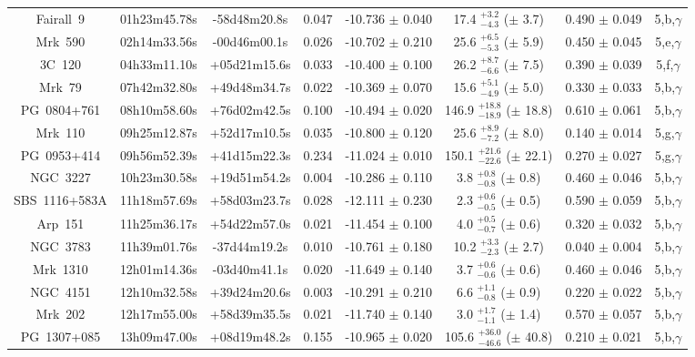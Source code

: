 \documentclass[a4paper,fleqn,usenatbib]{mnras}
\begin{document}
\begin{appendix}
\begin{longtable}{cccccccc}
Fairall~9 & 01h23m45.78s & -58d48m20.8s & 0.047 & -10.736 $\pm$ 0.040 & 17.4 $_{-4.3}^{+3.2}$ ($\pm$ 3.7) & 0.490 $\pm$ 0.049 & 5,b,$\gamma$ \\
Mrk~590 & 02h14m33.56s & -00d46m00.1s & 0.026 & -10.702 $\pm$ 0.210 & 25.6 $_{-5.3}^{+6.5}$ ($\pm$ 5.9) & 0.450 $\pm$ 0.045 & 5,e,$\gamma$ \\
3C~120 & 04h33m11.10s & +05d21m15.6s & 0.033 & -10.400 $\pm$ 0.100 & 26.2 $_{-6.6}^{+8.7}$ ($\pm$ 7.5) & 0.390 $\pm$ 0.039 & 5,f,$\gamma$ \\
Mrk~79 & 07h42m32.80s & +49d48m34.7s & 0.022 & -10.369 $\pm$ 0.070 & 15.6 $_{-4.9}^{+5.1}$ ($\pm$ 5.0) & 0.330 $\pm$ 0.033 & 5,b,$\gamma$ \\
PG~0804+761 & 08h10m58.60s & +76d02m42.5s & 0.100 & -10.494 $\pm$ 0.020 & 146.9 $_{-18.9}^{+18.8}$ ($\pm$ 18.8) & 0.610 $\pm$ 0.061 & 5,b,$\gamma$ \\
Mrk~110 & 09h25m12.87s & +52d17m10.5s & 0.035 & -10.800 $\pm$ 0.120 & 25.6 $_{-7.2}^{+8.9}$ ($\pm$ 8.0) & 0.140 $\pm$ 0.014 & 5,g,$\gamma$ \\
PG~0953+414 & 09h56m52.39s & +41d15m22.3s & 0.234 & -11.024 $\pm$ 0.010 & 150.1 $_{-22.6}^{+21.6}$ ($\pm$ 22.1) & 0.270 $\pm$ 0.027 & 5,g,$\gamma$ \\
NGC~3227 & 10h23m30.58s & +19d51m54.2s & 0.004 & -10.286 $\pm$ 0.110 & 3.8 $_{-0.8}^{+0.8}$ ($\pm$ 0.8) & 0.460 $\pm$ 0.046 & 5,b,$\gamma$ \\
SBS~1116+583A & 11h18m57.69s & +58d03m23.7s & 0.028 & -12.111 $\pm$ 0.230 & 2.3 $_{-0.5}^{+0.6}$ ($\pm$ 0.5) & 0.590 $\pm$ 0.059 & 5,b,$\gamma$ \\
Arp~151 & 11h25m36.17s & +54d22m57.0s & 0.021 & -11.454 $\pm$ 0.100 & 4.0 $_{-0.7}^{+0.5}$ ($\pm$ 0.6) & 0.320 $\pm$ 0.032 & 5,b,$\gamma$ \\
NGC~3783 & 11h39m01.76s & -37d44m19.2s & 0.010 & -10.761 $\pm$ 0.180 & 10.2 $_{-2.3}^{+3.3}$ ($\pm$ 2.7) & 0.040 $\pm$ 0.004 & 5,b,$\gamma$ \\
Mrk~1310 & 12h01m14.36s & -03d40m41.1s & 0.020 & -11.649 $\pm$ 0.140 & 3.7 $_{-0.6}^{+0.6}$ ($\pm$ 0.6) & 0.460 $\pm$ 0.046 & 5,b,$\gamma$ \\
NGC~4151 & 12h10m32.58s & +39d24m20.6s & 0.003 & -10.291 $\pm$ 0.210 & 6.6 $_{-0.8}^{+1.1}$ ($\pm$ 0.9) & 0.220 $\pm$ 0.022 & 5,b,$\gamma$ \\
Mrk~202 & 12h17m55.00s & +58d39m35.5s & 0.021 & -11.740 $\pm$ 0.140 & 3.0 $_{-1.1}^{+1.7}$ ($\pm$ 1.4) & 0.570 $\pm$ 0.057 & 5,b,$\gamma$ \\
PG~1307+085 & 13h09m47.00s & +08d19m48.2s & 0.155 & -10.965 $\pm$ 0.020 & 105.6 $_{-46.6}^{+36.0}$ ($\pm$ 40.8) & 0.210 $\pm$ 0.021 & 5,b,$\gamma$ \\

\end{longtable}
\end{appendix}
\end{document}
